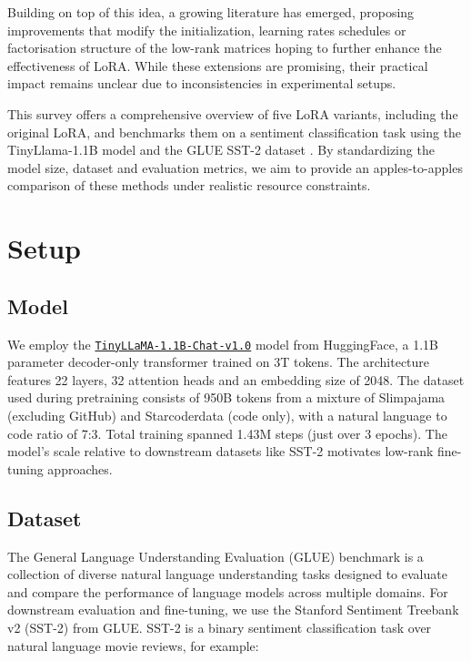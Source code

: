 \documentclass[a4paper,10pt,twocolumn,english]{article}
\begin{document}
Building on top of this idea, a growing literature has emerged, proposing improvements that modify the initialization, learning rates schedules or factorisation structure of the low-rank matrices hoping to further enhance the effectiveness of LoRA. While these extensions are promising, their practical impact remains unclear due to inconsistencies in experimental setups.

This survey offers a comprehensive overview of five LoRA variants, including the original LoRA, and benchmarks them on a sentiment classification task using the TinyLlama-1.1B model \cite{zhang2024tinyllamaopensourcesmalllanguage} and the GLUE SST-2 dataset \cite{wang2019gluemultitaskbenchmarkanalysis}. By standardizing the model size, dataset and evaluation metrics, we aim to provide an apples-to-apples comparison of these methods under realistic resource constraints.

\section{Setup}

\subsection{Model}

We employ the \href{https://huggingface.co/TinyLlama/TinyLlama-1.1B-Chat-v1.0}{\texttt{TinyLLaMA-1.1B-Chat-v1.0}} model from HuggingFace, a 1.1B parameter decoder-only transformer trained on 3T tokens. The architecture features 22 layers, 32 attention heads and an embedding size of 2048. The dataset used during pretraining consists of 950B tokens from a mixture of Slimpajama (excluding GitHub) and Starcoderdata (code only), with a natural language to code ratio of 7:3. Total training spanned 1.43M steps (just over 3 epochs). The model's scale relative to downstream datasets like SST-2 motivates low-rank fine-tuning approaches.

\subsection{Dataset}

The General Language Understanding Evaluation (GLUE) benchmark is a collection of diverse natural language understanding tasks designed to evaluate and compare the performance of language models across multiple domains. For downstream evaluation and fine-tuning, we use the Stanford Sentiment Treebank v2 (SST-2) from GLUE. SST-2 is a binary sentiment classification task over natural language movie reviews, for example:
\end{document}
